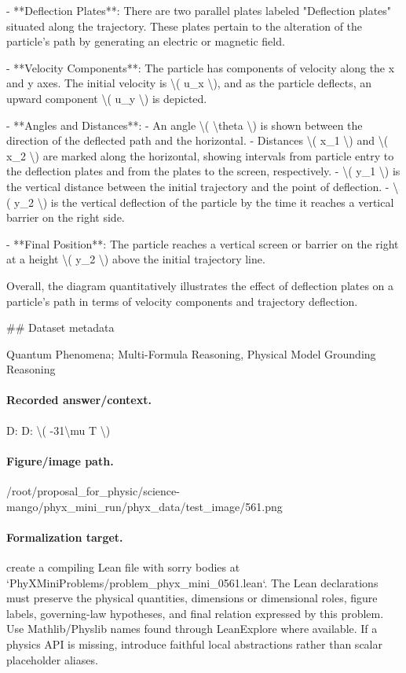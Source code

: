 - **Deflection Plates**: There are two parallel plates labeled "Deflection plates" situated along the trajectory. These plates pertain to the alteration of the particle’s path by generating an electric or magnetic field.

- **Velocity Components**: The particle has components of velocity along the x and y axes. The initial velocity is \textbackslash{}( u\_x \textbackslash{}), and as the particle deflects, an upward component \textbackslash{}( u\_y \textbackslash{}) is depicted.

- **Angles and Distances**:
  - An angle \textbackslash{}( \textbackslash{}theta \textbackslash{}) is shown between the direction of the deflected path and the horizontal.
  - Distances \textbackslash{}( x\_1 \textbackslash{}) and \textbackslash{}( x\_2 \textbackslash{}) are marked along the horizontal, showing intervals from particle entry to the deflection plates and from the plates to the screen, respectively.
  - \textbackslash{}( y\_1 \textbackslash{}) is the vertical distance between the initial trajectory and the point of deflection.
  - \textbackslash{}( y\_2 \textbackslash{}) is the vertical deflection of the particle by the time it reaches a vertical barrier on the right side.

- **Final Position**: The particle reaches a vertical screen or barrier on the right at a height \textbackslash{}( y\_2 \textbackslash{}) above the initial trajectory line.

Overall, the diagram quantitatively illustrates the effect of deflection plates on a particle's path in terms of velocity components and trajectory deflection.

\#\# Dataset metadata

Quantum Phenomena; Multi-Formula Reasoning, Physical Model Grounding Reasoning

\paragraph{Recorded answer/context.}
D: D: \textbackslash{}( -31\textbackslash{}mu T \textbackslash{})

\paragraph{Figure/image path.}
/root/proposal\_for\_physic/science-mango/phyx\_mini\_run/phyx\_data/test\_image/561.png

\paragraph{Formalization target.}
create a compiling Lean file with sorry bodies at `PhyXMiniProblems/problem\_phyx\_mini\_0561.lean`. The Lean declarations must preserve the physical quantities, dimensions or dimensional roles, figure labels, governing-law hypotheses, and final relation expressed by this problem.
Use Mathlib/Physlib names found through LeanExplore where available. If a physics API is missing, introduce faithful local abstractions rather than scalar placeholder aliases.

